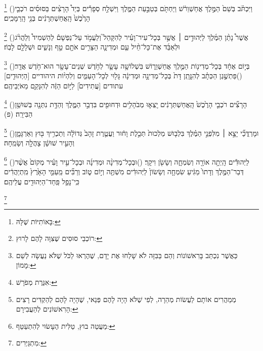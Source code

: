 \documentclass[12pt, openany]{book}
\newcommand{\footnotecomment}[1]{
	\renewcommand\thefootnote{}
	\footnote{\textsf{#1}}}
\newcommand{\commenta}[1]{\footnotecomment{#1}\hspace{0em}}
\newcommand{\vsnum}[1]{(\hebrewnumeral{#1})\space}
\begin{document}
{\commenta{ בָּאוֹתִיּוֹת שֶׁלָּהּ:}%
\vsnum{10}וַיִּכְתֹּ֗ב בְּשֵׁם֙ הַמֶּ֣לֶךְ אֲחַשְׁוֵרֹ֔שׁ וַיַּחְתֹּ֖ם בְּטַבַּ֣עַת הַמֶּ֑לֶךְ וַיִּשְׁלַ֣ח סְפָרִ֡ים בְּיַד֩ הָרָצִ֨ים בַּסּוּסִ֜ים רֹכְבֵ֤י הָרֶ֙כֶשׁ֙ הָֽאֲחַשְׁתְּרָנִ֔ים בְּנֵ֖י הָֽרַמָּכִֽים׃%
\commenta{ רוֹכְבֵי סוּסִים שֶׁצִּוָּה לָהֶם לָרוּץ:}%
\vsnum{11}אֲשֶׁר֩ נָתַ֨ן הַמֶּ֜לֶךְ לַיְּהוּדִ֣ים ׀ אֲשֶׁ֣ר בְּכָל־עִיר־וָעִ֗יר לְהִקָּהֵל֮ וְלַעֲמֹ֣ד עַל־נַפְשָׁם֒ לְהַשְׁמִיד֩ וְלַהֲרֹ֨ג וּלְאַבֵּ֜ד אֶת־כָּל־חֵ֨יל עַ֧ם וּמְדִינָ֛ה הַצָּרִ֥ים אֹתָ֖ם טַ֣ף וְנָשִׁ֑ים וּשְׁלָלָ֖ם לָבֽוֹז׃%
\commenta{ כַּאֲשֶׁר נִכְתַּב בָּרִאשׁוֹנוֹת וְהֵם בַּבִּזָּה לֹא שָׁלְחוּ אֶת יָדָם, שֶׁהֶרְאוּ לַכֹּל שֶׁלֹּא נַעֲשָׂה לְשֵׁם מָמוֹן: }%
\vsnum{12}בְּי֣וֹם אֶחָ֔ד בְּכָל־מְדִינ֖וֹת הַמֶּ֣לֶךְ אֲחַשְׁוֵר֑וֹשׁ בִּשְׁלוֹשָׁ֥ה עָשָׂ֛ר לְחֹ֥דֶשׁ שְׁנֵים־עָשָׂ֖ר הוּא־חֹ֥דֶשׁ אֲדָֽר׃
\vsnum{13}פַּתְשֶׁ֣גֶן הַכְּתָ֗ב לְהִנָּ֤תֵֽן דָּת֙ בְּכָל־מְדִינָ֣ה וּמְדִינָ֔ה גָּל֖וּי לְכָל־הָעַמִּ֑ים וְלִהְי֨וֹת היהודיים [הַיְּהוּדִ֤ים] עתודים [עֲתִידִים֙] לַיּ֣וֹם הַזֶּ֔ה לְהִנָּקֵ֖ם מֵאֹיְבֵיהֶֽם׃%
\commenta{ אִגֶּרֶת מְפֹרָשׁ:}%
\vsnum{14}הָרָצִ֞ים רֹכְבֵ֤י הָרֶ֙כֶשׁ֙ הָֽאֲחַשְׁתְּרָנִ֔ים יָֽצְא֛וּ מְבֹהָלִ֥ים וּדְחוּפִ֖ים בִּדְבַ֣ר הַמֶּ֑לֶךְ וְהַדָּ֥ת נִתְּנָ֖ה בְּשׁוּשַׁ֥ן הַבִּירָֽה׃ (פ)%
\commenta{ מְמַהֲרִים אוֹתָם לַעֲשׂוֹת מְהֵרָה, לְפִי שֶׁלֹּא הָיָה לָהֶם פְּנַאי, שֶׁהָיָה לָהֶם לְהַקְדִּים רָצִים הָרִאשׁוֹנִים לְהַעֲבִירָם: }%
\vsnum{15}וּמָרְדֳּכַ֞י יָצָ֣א ׀ מִלִּפְנֵ֣י הַמֶּ֗לֶךְ בִּלְב֤וּשׁ מַלְכוּת֙ תְּכֵ֣לֶת וָח֔וּר וַעֲטֶ֤רֶת זָהָב֙ גְּדוֹלָ֔ה וְתַכְרִ֥יךְ בּ֖וּץ וְאַרְגָּמָ֑ן וְהָעִ֣יר שׁוּשָׁ֔ן צָהֲלָ֖ה וְשָׂמֵֽחָה׃%
\commenta{ מַעֲטֵה בוּץ, טַלִּית הֶעָשׂוּי לְהִתְעַטֵּף: }%
\vsnum{16}לַיְּהוּדִ֕ים הָֽיְתָ֥ה אוֹרָ֖ה וְשִׂמְחָ֑ה וְשָׂשֹׂ֖ן וִיקָֽר׃
\vsnum{17}וּבְכָל־מְדִינָ֨ה וּמְדִינָ֜ה וּבְכָל־עִ֣יר וָעִ֗יר מְקוֹם֙ אֲשֶׁ֨ר דְּבַר־הַמֶּ֤לֶךְ וְדָתוֹ֙ מַגִּ֔יעַ שִׂמְחָ֤ה וְשָׂשׂוֹן֙ לַיְּהוּדִ֔ים מִשְׁתֶּ֖ה וְי֣וֹם ט֑וֹב וְרַבִּ֞ים מֵֽעַמֵּ֤י הָאָ֙רֶץ֙ מִֽתְיַהֲדִ֔ים כִּֽי־נָפַ֥ל פַּֽחַד־הַיְּהוּדִ֖ים עֲלֵיהֶֽם׃%
\commenta{ מִתְגַּיְּרִים:}%
\clearpage}
\end{document}
